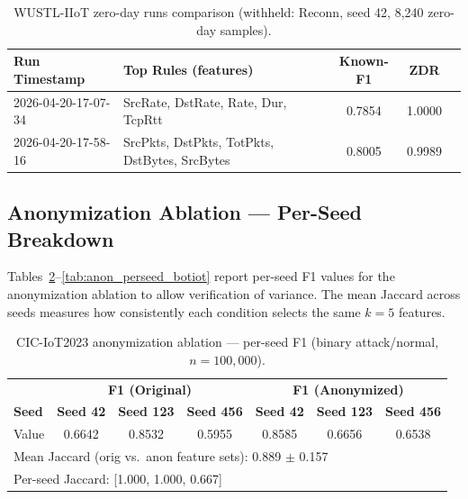 \begin{table}[htbp]
\centering
\caption{WUSTL-IIoT zero-day runs comparison (withheld: Reconn, seed 42,
  8{,}240 zero-day samples).}
\label{tab:zeroday_wustl_both}
\begin{tabular}{llccc}
\toprule
\textbf{Run Timestamp} & \textbf{Top Rules (features)} & \textbf{Known-F1} & \textbf{ZDR} \\
\midrule
2026-04-20-17-07-34 & SrcRate, DstRate, Rate, Dur, TcpRtt & 0.7854 & 1.0000 \\
2026-04-20-17-58-16 & SrcPkts, DstPkts, TotPkts, DstBytes, SrcBytes & 0.8005 & 0.9989 \\
\bottomrule
\end{tabular}
\end{table}

\subsection{Anonymization Ablation --- Per-Seed Breakdown}

Tables~\ref{tab:anon_perseed_cic}--\ref{tab:anon_perseed_botiot} report
per-seed F1 values for the anonymization ablation to allow verification of
variance. The mean Jaccard across seeds measures how consistently each
condition selects the same $k=5$ features.

\begin{table}[htbp]
\centering
\caption{CIC-IoT2023 anonymization ablation --- per-seed F1
  (binary attack/normal, $n{=}100{,}000$).}
\label{tab:anon_perseed_cic}
\begin{tabular}{lccc|ccc}
\toprule
 & \multicolumn{3}{c|}{\textbf{F1 (Original)}} & \multicolumn{3}{c}{\textbf{F1 (Anonymized)}} \\
\textbf{Seed} & \textbf{Seed 42} & \textbf{Seed 123} & \textbf{Seed 456} &
               \textbf{Seed 42} & \textbf{Seed 123} & \textbf{Seed 456} \\
\midrule
Value & 0.6642 & 0.8532 & 0.5955 & 0.8585 & 0.6656 & 0.6538 \\
\midrule
\multicolumn{7}{l}{Mean Jaccard (orig vs.\ anon feature sets): 0.889 $\pm$ 0.157}\\
\multicolumn{7}{l}{Per-seed Jaccard: [1.000, 1.000, 0.667]}\\
\bottomrule
\end{tabular}
\end{table}

